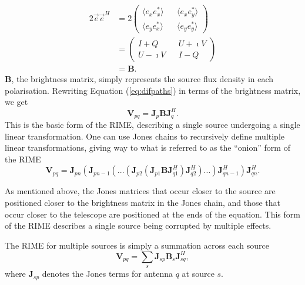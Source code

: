 \documentclass{article}
\begin{document}
\begin{align}
2\Vec{e}\Vec{e}^H &= 2\begin{pmatrix} 
\langle e_x e_x^* \rangle && \langle e_x e_y^* \rangle \\
\langle e_y e_x^* \rangle && \langle e_y e_y^* \rangle
\end{pmatrix}
\\
&= \begin{pmatrix}
I + Q && U + \imath V \\
U - \imath V && I - Q
\end{pmatrix} \\
&= \mathbf{B} .
\end{align}
$\mathbf{B}$, the brightness matrix, simply represents the source flux density in each polarisation. Rewriting Equation (\ref{eq:difpaths}) in terms of the brightness matrix, we get
\begin{equation}
\mathbf{V}_{pq} = \mathbf{J}_p \mathbf{B} \mathbf{J}_q^H .
\end{equation}
This is the basic form of the RIME, describing a single source undergoing a single linear transformation. One can use Jones chains to recursively define multiple linear transformations, giving way to what is referred to as the ``onion'' form of the RIME\citep{smirnov2011}
\begin{equation}
\mathbf{V}_{pq} = \mathbf{J}_{pn}(\mathbf{J}_{pn-1}(...(\mathbf{J}_{p2}(\mathbf{J}_{p1} \mathbf{B} \mathbf{J}^H_{q1})\mathbf{J}^H_{q2})...)\mathbf{J}^H_{qn-1})\mathbf{J}^H_{qn} .
\end{equation} 

As mentioned above, the Jones matrices that occur closer to the source are positioned closer to the brightness matrix in the Jones chain, and those that occur closer to the telescope are positioned at the ends of the equation. This form of the RIME describes a single source being corrupted by multiple effects. 

The RIME for multiple sources is simply a summation across each source
\begin{equation}
\label{eq:multiplesources}
    \mathbf{V}_{pq} = \sum_s \mathbf{J}_{sp} \mathbf{B}_s \mathbf{J}^H_{sq} ,
\end{equation}
where $\mathbf{J}_{sp}$ denotes the Jones terms for antenna $q$ at source $s$. 
\end{document}
